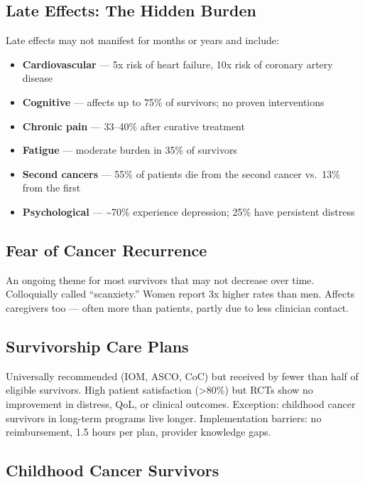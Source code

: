 \subsection{Late Effects: The Hidden
Burden}\label{late-effects-the-hidden-burden}

Late effects may not manifest for months or years and include:

\begin{itemize}
\tightlist
\item
  \textbf{Cardiovascular} --- 5x risk of heart failure, 10x risk of
  coronary artery disease
\item
  \textbf{Cognitive} --- affects up to 75\% of survivors; no proven
  interventions
\item
  \textbf{Chronic pain} --- 33--40\% after curative treatment
\item
  \textbf{Fatigue} --- moderate burden in 35\% of survivors
\item
  \textbf{Second cancers} --- 55\% of patients die from the second
  cancer vs.~13\% from the first
\item
  \textbf{Psychological} --- \textasciitilde70\% experience depression;
  25\% have persistent distress
\end{itemize}

\subsection{Fear of Cancer Recurrence}\label{fear-of-cancer-recurrence}

An ongoing theme for most survivors that may not decrease over time.
Colloquially called ``scanxiety.'' Women report 3x higher rates than
men. Affects caregivers too --- often more than patients, partly due to
less clinician contact.

\subsection{Survivorship Care Plans}\label{survivorship-care-plans}

Universally recommended (IOM, ASCO, CoC) but received by fewer than half
of eligible survivors. High patient satisfaction (\textgreater80\%) but
RCTs show no improvement in distress, QoL, or clinical outcomes.
Exception: childhood cancer survivors in long-term programs live longer.
Implementation barriers: no reimbursement, 1.5 hours per plan, provider
knowledge gaps.

\subsection{Childhood Cancer
Survivors}\label{childhood-cancer-survivors}

